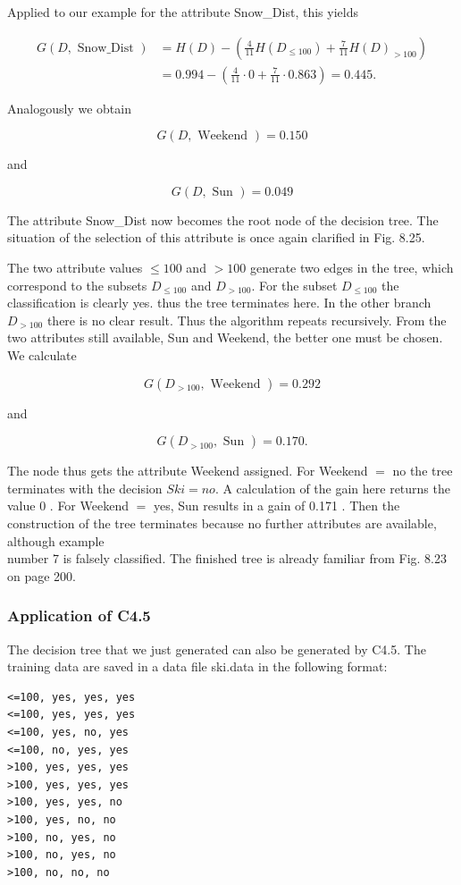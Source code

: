 \documentclass[10pt]{article}
\begin{document}
Applied to our example for the attribute Snow\_Dist, this yields

$$
\begin{aligned}
G(D, \text { Snow_Dist }) & =H(D)-\left(\frac{4}{11} H\left(D_{\leq 100}\right)+\frac{7}{11} H(D)_{>100}\right) \\
& =0.994-\left(\frac{4}{11} \cdot 0+\frac{7}{11} \cdot 0.863\right)=0.445 .
\end{aligned}
$$

Analogously we obtain

$$
G(D, \text { Weekend })=0.150
$$

and

$$
G(D, \text { Sun })=0.049
$$

The attribute Snow\_Dist now becomes the root node of the decision tree. The situation of the selection of this attribute is once again clarified in Fig. 8.25.

The two attribute values $\leq 100$ and $>100$ generate two edges in the tree, which correspond to the subsets $D_{\leq 100}$ and $D_{>100}$. For the subset $D_{\leq 100}$ the classification is clearly yes. thus the tree terminates here. In the other branch $D_{>100}$ there is no clear result. Thus the algorithm repeats recursively. From the two attributes still available, Sun and Weekend, the better one must be chosen. We calculate

$$
G\left(D_{>100}, \text { Weekend }\right)=0.292
$$

and

$$
G\left(D_{>100}, \text { Sun }\right)=0.170 .
$$

The node thus gets the attribute Weekend assigned. For Weekend $=$ no the tree terminates with the decision $S k i=n o$. A calculation of the gain here returns the value 0 . For Weekend $=$ yes, Sun results in a gain of 0.171 . Then the construction of the tree terminates because no further attributes are available, although example\\
number 7 is falsely classified. The finished tree is already familiar from Fig. 8.23 on page 200.

\subsubsection*{Application of C4.5}
The decision tree that we just generated can also be generated by C4.5. The training data are saved in a data file ski.data in the following format:

\begin{verbatim}
<=100, yes, yes, yes
<=100, yes, yes, yes
<=100, yes, no, yes
<=100, no, yes, yes
>100, yes, yes, yes
>100, yes, yes, yes
>100, yes, yes, no
>100, yes, no, no
>100, no, yes, no
>100, no, yes, no
>100, no, no, no
\end{verbatim}
\end{document}
